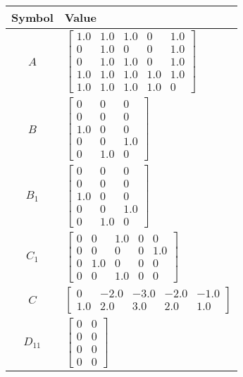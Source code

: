 \begin{tabular}{cl}
\hline
  Symbol  & Value                                                                                                                                                                      \\
\hline
   $A$    & $\left[\begin{matrix}1.0 & 1.0 & 1.0 & 0 & 1.0\\0 & 1.0 & 0 & 0 & 1.0\\0 & 1.0 & 1.0 & 0 & 1.0\\1.0 & 1.0 & 1.0 & 1.0 & 1.0\\1.0 & 1.0 & 1.0 & 1.0 & 0\end{matrix}\right]$ \\
   $B$    & $\left[\begin{matrix}0 & 0 & 0\\0 & 0 & 0\\1.0 & 0 & 0\\0 & 0 & 1.0\\0 & 1.0 & 0\end{matrix}\right]$                                                                       \\
 $B_{1}$  & $\left[\begin{matrix}0 & 0 & 0\\0 & 0 & 0\\1.0 & 0 & 0\\0 & 0 & 1.0\\0 & 1.0 & 0\end{matrix}\right]$                                                                       \\
 $C_{1}$  & $\left[\begin{matrix}0 & 0 & 1.0 & 0 & 0\\0 & 0 & 0 & 0 & 1.0\\0 & 1.0 & 0 & 0 & 0\\0 & 0 & 1.0 & 0 & 0\end{matrix}\right]$                                                \\
   $C$    & $\left[\begin{matrix}0 & -2.0 & -3.0 & -2.0 & -1.0\\1.0 & 2.0 & 3.0 & 2.0 & 1.0\end{matrix}\right]$                                                                        \\
 $D_{11}$ & $\left[\begin{matrix}0 & 0\\0 & 0\\0 & 0\\0 & 0\end{matrix}\right]$                                                                                                        \\

\end{tabular}
